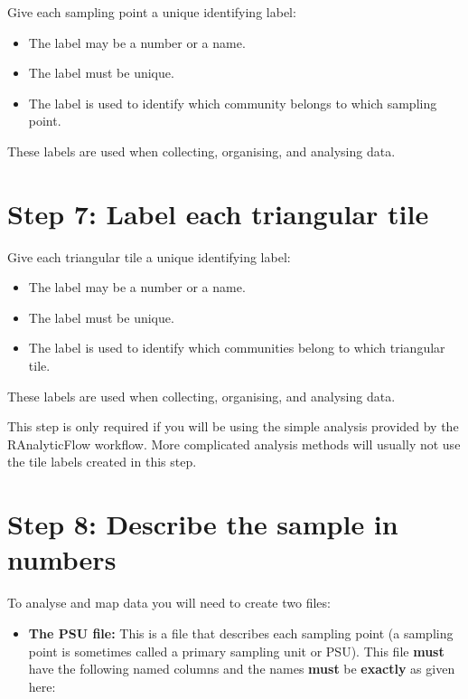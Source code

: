 \documentclass[12pt,a4paper]{book}
\providecommand{\tightlist}{%
  \setlength{\itemsep}{0pt}\setlength{\parskip}{0pt}}
\theoremstyle{definition}
\theoremstyle{definition}
\theoremstyle{definition}
\theoremstyle{remark}
\let\BeginKnitrBlock\begin \let\EndKnitrBlock\end
\begin{document}
Give each sampling point a unique identifying label:

\begin{itemize}
\item
  The label may be a number or a name.
\item
  The label must be unique.
\item
  The label is used to identify which community belongs to which
  sampling point.
\end{itemize}

These labels are used when collecting, organising, and analysing data.

\hypertarget{step-7-label-each-triangular-tile}{%
\section{Step 7: Label each triangular
tile}\label{step-7-label-each-triangular-tile}}

Give each triangular tile a unique identifying label:

\begin{itemize}
\item
  The label may be a number or a name.
\item
  The label must be unique.
\item
  The label is used to identify which communities belong to which
  triangular tile.
\end{itemize}

These labels are used when collecting, organising, and analysing data.

\BeginKnitrBlock{rmdnote}
This step is only required if you will be using the simple analysis
provided by the RAnalyticFlow workflow. More complicated analysis
methods will usually not use the tile labels created in this step.
\EndKnitrBlock{rmdnote}

\hypertarget{step-8-describe-the-sample-in-numbers}{%
\section{Step 8: Describe the sample in
numbers}\label{step-8-describe-the-sample-in-numbers}}

To analyse and map data you will need to create two files:

\begin{itemize}
\tightlist
\item
  \textbf{The PSU file:} This is a file that describes each sampling
  point (a sampling point is sometimes called a primary sampling unit or
  PSU). This file \textbf{must} have the following named columns and the
  names \textbf{must} be \textbf{exactly} as given here:
\end{itemize}
\end{document}
